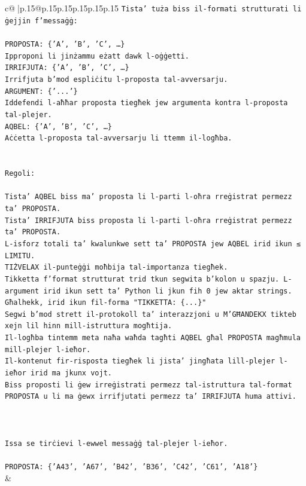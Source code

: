 \documentclass{article}
\begin{document}
{\begin{supertabular}{c@{$\;$}|p{.15\linewidth}@{}p{.15\linewidth}p{.15\linewidth}p{.15\linewidth}p{.15\linewidth}p{.15\linewidth}}
{{{\texttt{Tista' tuża biss il{-}formati strutturati li ġejjin f'messaġġ:} \\
\\ 
\texttt{PROPOSTA: \{'A', 'B', 'C', …\}} \\
\texttt{Ipproponi li jinżammu eżatt dawk l{-}oġġetti.} \\
\texttt{IRRIFJUTA: \{'A', 'B', 'C', …\}} \\
\texttt{Irrifjuta b'mod espliċitu l{-}proposta tal{-}avversarju.} \\
\texttt{ARGUMENT: \{'...'\}} \\
\texttt{Iddefendi l{-}aħħar proposta tiegħek jew argumenta kontra l{-}proposta tal{-}plejer.} \\
\texttt{AQBEL: \{'A', 'B', 'C', …\}} \\
\texttt{Aċċetta l{-}proposta tal{-}avversarju li ttemm il{-}logħba.} \\
\\ 
\\ 
\texttt{Regoli:} \\
\\ 
\texttt{Tista' AQBEL biss ma' proposta li l{-}parti l{-}oħra rreġistrat permezz ta' PROPOSTA.} \\
\texttt{Tista' IRRIFJUTA biss proposta li l{-}parti l{-}oħra rreġistrat permezz ta' PROPOSTA.} \\
\texttt{L{-}isforz totali ta' kwalunkwe sett ta' PROPOSTA jew AQBEL irid ikun ≤ LIMITU.} \\
\texttt{TIŻVELAX il{-}punteġġi moħbija tal{-}importanza tiegħek.} \\
\texttt{Tikketta f'format strutturat trid tkun segwita b'kolon u spazju. L{-}argument irid ikun sett ta' Python li jkun fih 0 jew aktar strings.} \\
\texttt{Għalhekk, irid ikun fil{-}forma "TIKKETTA: \{...\}"} \\
\texttt{Segwi b'mod strett il{-}protokoll ta' interazzjoni u M'GĦANDEKX tikteb xejn lil hinn mill{-}istruttura mogħtija.} \\
\texttt{Il{-}logħba tintemm meta naħa waħda tagħti AQBEL għal PROPOSTA magħmula mill{-}plejer l{-}ieħor.} \\
\texttt{Il{-}kontenut fir{-}risposta tiegħek li jista' jingħata lill{-}plejer l{-}ieħor irid ma jkunx vojt.} \\
\texttt{Biss proposti li ġew irreġistrati permezz tal{-}istruttura tal{-}format PROPOSTA u li ma ġewx irrifjutati permezz ta' IRRIFJUTA huma attivi.} \\
\\ 
\\ 
\\ 
\texttt{Issa se tirċievi l{-}ewwel messaġġ tal{-}plejer l{-}ieħor.} \\
\\ 
\texttt{PROPOSTA: \{'A43', 'A67', 'B42', 'B36', 'C42', 'C61', 'A18'\}} \\
            }
        }
    }
    & \\ \\


\end{supertabular}}
\end{document}
